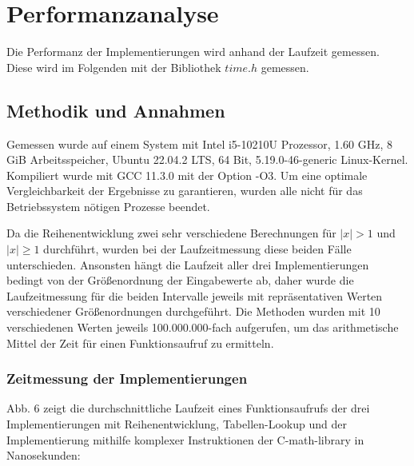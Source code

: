 \documentclass[course=erap] {aspdoc}
\begin{document}
    \section{Performanzanalyse}\label{sec:performanzanalyse}

    Die Performanz der Implementierungen wird anhand der Laufzeit gemessen.
    Diese wird im Folgenden mit der Bibliothek $time.h$ gemessen.

    \subsection{Methodik und Annahmen}\label{subsec:methodik-und-annahmen}

    Gemessen wurde auf einem System mit Intel i5-10210U Prozessor, 1.60 GHz, 8 GiB Arbeitsspeicher, Ubuntu 22.04.2 LTS, 64 Bit, 5.19.0-46-generic Linux-Kernel.
    Kompiliert wurde mit GCC 11.3.0 mit der Option -O3. Um eine optimale Vergleichbarkeit der Ergebnisse zu garantieren, wurden alle nicht für das Betriebssystem nötigen Prozesse beendet.

    Da die Reihenentwicklung zwei sehr verschiedene Berechnungen für $|x|>1$ und $|x|\geq 1$ durchführt, wurden bei der Laufzeitmessung diese beiden Fälle unterschieden.
    Ansonsten hängt die Laufzeit aller drei Implementierungen bedingt von der Größenordnung der Eingabewerte ab, daher wurde die Laufzeitmessung für die beiden Intervalle jeweils mit repräsentativen Werten verschiedener Größenordnungen durchgeführt.
    Die Methoden wurden mit 10 verschiedenen Werten jeweils 100.000.000-fach aufgerufen, um das arithmetische Mittel der Zeit für einen Funktionsaufruf zu ermitteln.

    \subsubsection{Zeitmessung der Implementierungen}

    Abb. 6 zeigt die durchschnittliche Laufzeit eines Funktionsaufrufs der drei Implementierungen mit Reihenentwicklung, Tabellen-Lookup und der Implementierung mithilfe komplexer Instruktionen der C-math-library in Nanosekunden:
\end{document}
